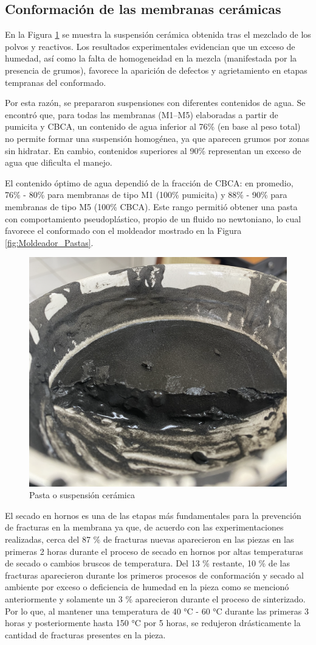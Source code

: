 \documentclass{article}
\begin{document}
\subsection{Conformación de las membranas cerámicas}

En la Figura \ref{fig:Pasta_Cerámica} se muestra la suspensión 
cerámica obtenida tras el mezclado de los polvos y reactivos. 
Los resultados experimentales evidencian que un exceso de humedad, 
así como la falta de homogeneidad en la 
mezcla (manifestada por la presencia de grumos), favorece la 
aparición de defectos y agrietamiento en etapas tempranas del 
conformado.

Por esta razón, se prepararon suspensiones con diferentes contenidos 
de agua. Se encontró que, para todas las membranas (M1–M5) 
elaboradas a partir de pumicita y CBCA, un contenido de agua 
inferior al 76\% (en base al peso total) no permite formar una 
suspensión homogénea, ya que aparecen grumos por zonas sin hidratar. 
En cambio, contenidos superiores al 90\% representan un exceso de 
agua que dificulta el manejo.

El contenido óptimo de agua dependió de la fracción de CBCA: en 
promedio, 76\% - 80\% para membranas de tipo M1 (100\% pumicita) y 
88\% - 90\% para membranas de tipo M5 (100\% CBCA). Este rango 
permitió obtener una pasta con comportamiento pseudoplástico, propio 
de un fluido no newtoniano, lo cual favorece el conformado con el 
moldeador mostrado en la Figura \ref{fig:Moldeador_Pastas}.

\begin{figure}[!htbp]
    \centering
    \includegraphics[width=0.5\linewidth]{Graphics/Suspension ceramica.png}
    \caption{Pasta o suspensión cerámica}
    \label{fig:Pasta_Cerámica}
\end{figure}

El secado en hornos es una de las etapas más fundamentales para la 
prevención de fracturas en la membrana ya que, de acuerdo con las 
experimentaciones realizadas, cerca del 87 \% de fracturas nuevas 
aparecieron en las piezas en las primeras 2 horas durante el proceso 
de secado en hornos por altas temperaturas de secado o cambios bruscos 
de temperatura. Del 13 \% restante, 10 \% de las fracturas aparecieron 
durante los primeros procesos de conformación y secado al ambiente por 
exceso o deficiencia de humedad en la pieza como se mencionó anteriormente 
y solamente un 3 \% aparecieron durante el proceso de sinterizado. 
Por lo que, al mantener una temperatura de 40 °C - 60 °C durante las 
primeras 3 horas y posteriormente hasta 150 °C por 5 horas, 
se redujeron drásticamente la cantidad de fracturas presentes en la 
pieza. 
 
\end{document}
